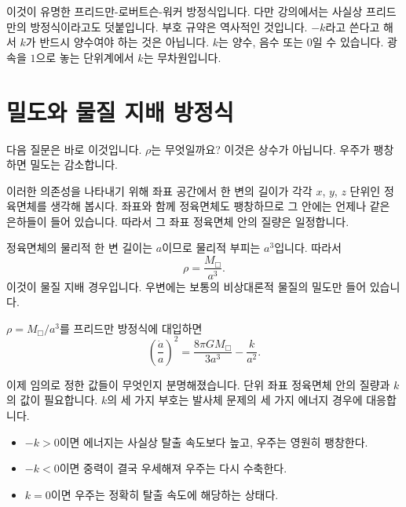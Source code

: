 이것이 유명한 프리드만-로버트슨-워커 방정식입니다. 다만 강의에서는 사실상 프리드만의 방정식이라고도 덧붙입니다. 부호 규약은 역사적인 것입니다. \(-k\)라고 쓴다고 해서 \(k\)가 반드시 양수여야 하는 것은 아닙니다. \(k\)는 양수, 음수 또는 0일 수 있습니다. 광속을 \(1\)으로 놓는 단위계에서 \(k\)는 무차원입니다.

\section{밀도와 물질 지배 방정식}

다음 질문은 바로 이것입니다. \(\rho\)는 무엇일까요? 이것은 상수가 아닙니다. 우주가 팽창하면 밀도는 감소합니다.

이러한 의존성을 나타내기 위해 좌표 공간에서 한 변의 길이가 각각 \(x\), \(y\), \(z\) 단위인 정육면체를 생각해 봅시다. 좌표와 함께 정육면체도 팽창하므로 그 안에는 언제나 같은 은하들이 들어 있습니다. 따라서 그 좌표 정육면체 안의 질량은 일정합니다.


정육면체의 물리적 한 변 길이는 \(a\)이므로 물리적 부피는 \(a^3\)입니다. 따라서
\begin{equation}
\rho=\frac{M_{\Box}}{a^3}.
\end{equation}
이것이 물질 지배 경우입니다. 우변에는 보통의 비상대론적 물질의 밀도만 들어 있습니다.

\begin{classroomqa}
\end{classroomqa}

\(\rho=M_{\Box}/a^3\)를 프리드만 방정식에 대입하면
\begin{equation}
\left(\frac{\dot a}{a}\right)^2=\frac{8\pi G M_{\Box}}{3a^3}-\frac{k}{a^2}.
\end{equation}

이제 임의로 정한 값들이 무엇인지 분명해졌습니다. 단위 좌표 정육면체 안의 질량과 \(k\)의 값이 필요합니다. \(k\)의 세 가지 부호는 발사체 문제의 세 가지 에너지 경우에 대응합니다.

\begin{itemize}
\item \(-k>0\)이면 에너지는 사실상 탈출 속도보다 높고, 우주는 영원히 팽창한다.
\item \(-k<0\)이면 중력이 결국 우세해져 우주는 다시 수축한다.
\item \(k=0\)이면 우주는 정확히 탈출 속도에 해당하는 상태다.
\end{itemize}

